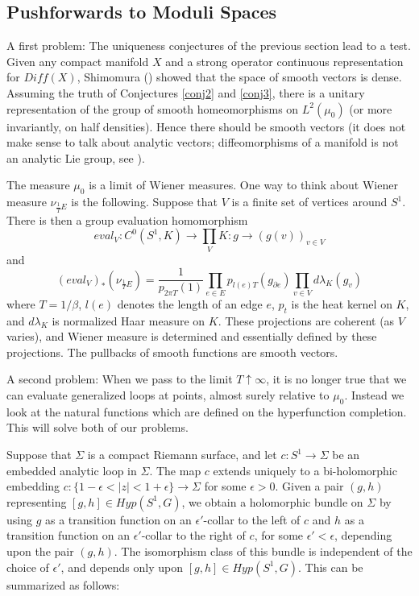 \documentclass{amsart}
\theoremstyle{conjecture}
\theoremstyle{definition}
\theoremstyle{question}
\theoremstyle{questions}
\theoremstyle{remark}
\theoremstyle{remarks}
\theoremstyle{example}
\numberwithin{equation}{section}
\begin{document}
\subsection{Pushforwards to Moduli Spaces}\label{modulispace}

A first problem: The uniqueness conjectures of the previous section lead to a test. Given any compact manifold $X$ and a strong operator continuous representation
for $Diff(X)$, Shimomura (\cite{Shimomura}) showed that the space of smooth vectors is dense. Assuming
the truth of Conjectures \ref{conj2} and \ref{conj3}, there is a unitary representation of the group of smooth homeomorphisms on $L^2(\mu_0)$ (or more invariantly, on half densities). Hence there should be smooth vectors
(it does not make sense to talk about analytic vectors; diffeomorphisms of a manifold is not an analytic Lie group, see \cite{Milnor}).

The measure $\mu_0$ is a limit of Wiener measures. One way to think about Wiener measure
$\nu_{\frac 1T E}$ is the following.  Suppose that $V$ is a finite set of vertices around $S^1$. There is then a group evaluation homomorphism
$$eval_V:C^0(S^1,K) \to \prod_V K:g \to (g(v))_{v\in V}$$
and
$$(eval_V)_*(\nu_{\frac 1T E})=\frac{1}{p_{2\pi T}(1)}\prod_{e\in E}p_{l(e)T}(g_{\partial e})\prod_{v\in V}d\lambda_K(g_v)$$
where $T=1/\beta$, $l(e)$ denotes the length of an edge $e$, $p_t$ is the heat kernel on $K$, and $d\lambda_K$ is normalized Haar measure on $K$. These projections are coherent (as $V$ varies), and Wiener measure is determined and essentially defined by these projections. The pullbacks of smooth functions are smooth vectors.

A second problem: When we pass to the limit $T \uparrow \infty$, it is no longer true that we can evaluate generalized loops at points, almost surely relative to $\mu_0$. Instead we look at the natural functions which are defined on the hyperfunction completion. This will solve both of our problems.

Suppose that $\Sigma$ is a compact Riemann surface, and let $c:S^1 \to \Sigma$ be an embedded analytic loop in $\Sigma$.  The map $c$ extends
uniquely to a bi-holomorphic embedding
$c:\{1-\epsilon <\vert z\vert <1+\epsilon \}\to\Sigma$ for some $
\epsilon >0$.  Given a pair
$(g,h)$ representing $[g,h]\in Hyp(S^1,G)$, we obtain a holomorphic bundle on $\Sigma$ by using $g$ as
a transition function on an $\epsilon'$-collar to the left of $c$ and
$h$ as a transition function on an $\epsilon'$-collar to the right of
$c$, for some $\epsilon'<\epsilon$, depending upon the pair $(g,h)$.  The
isomorphism class of this bundle is independent of the
choice of $\epsilon'$, and depends only upon $[g,h]\in Hyp(S^1,G)$. This can be summarized as follows:
\end{document}
